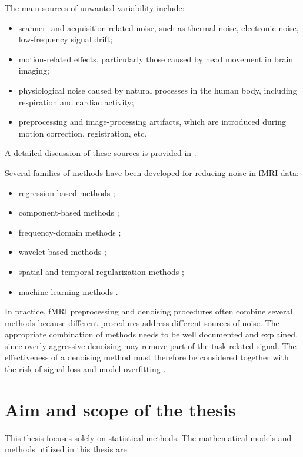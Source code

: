 \documentclass[english]{pwr_wmat_praca_dyplomowa}
\theoremstyle{definition}
\theoremstyle{remark}
\begin{document}
The main sources of unwanted variability include:
\begin{itemize}[itemsep=1pt, topsep=1pt]
    \item scanner- and acquisition-related noise, such as thermal noise, electronic noise, low-frequency signal drift;
    \item motion-related effects, particularly those caused by head movement in brain imaging;
    \item physiological noise caused by natural processes in the human body, including respiration and cardiac activity;
    \item preprocessing and image-processing artifacts, which are introduced during motion correction, registration, etc.
\end{itemize}
A detailed discussion of these sources is provided in \cite[Chapter 7]{fmri}.

Several families of methods have been developed for reducing noise in fMRI data:
\begin{itemize}[itemsep=1pt]
    \item regression-based methods \cite{denoising-methods};
    \item component-based methods \cite{denoising-methods};
    \item frequency-domain methods \cite{denoising-methods};
    \item wavelet-based methods \cite{denoising-methods, wavelet-denoising};
    \item spatial and temporal regularization methods \cite{regularization-denoising};
    \item machine-learning methods \cite{deep-learning-denoising}.
\end{itemize}

In practice, fMRI preprocessing and denoising procedures often combine several methods because different procedures address different sources of noise. The appropriate combination of methods needs to be well documented and explained, since overly aggressive denoising may remove part of the task-related signal. The effectiveness of a denoising method must therefore be considered together with the risk of signal loss and model overfitting \cite{denoising-methods,glm-denoise}.

\section{Aim and scope of the thesis}

This thesis focuses solely on statistical methods. The mathematical models and methods utilized in this thesis are:
\end{document}
